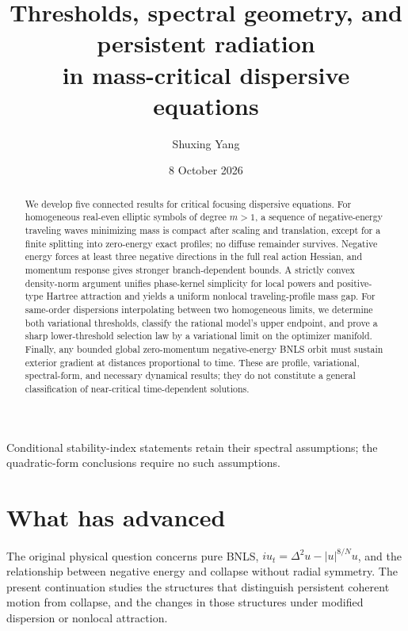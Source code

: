 \documentclass[11pt,a4paper]{article}
\title{Thresholds, spectral geometry, and persistent radiation\\in mass-critical dispersive equations}
\author{Shuxing Yang}
\date{8 October 2026}
\theoremstyle{remark}\newtheorem{remark}[theorem]{Remark}
\begin{document}
\maketitle
\begin{abstract}
We develop five connected results for critical focusing dispersive equations.
For homogeneous real-even elliptic symbols of degree $m>1$, a sequence of
negative-energy traveling waves minimizing mass is compact after scaling
and translation, except for a finite splitting into zero-energy exact
profiles; no diffuse remainder survives. Negative energy forces at least
three negative directions in the full real action Hessian, and momentum
response gives stronger branch-dependent bounds. A strictly convex
density-norm argument unifies phase-kernel simplicity for local powers
and positive-type Hartree attraction and yields a uniform nonlocal
traveling-profile mass gap. For same-order dispersions interpolating
between two homogeneous limits, we determine both variational thresholds,
classify the rational model's upper endpoint, and prove a sharp
lower-threshold selection law by a variational limit on the optimizer
manifold. Finally, any bounded global zero-momentum negative-energy BNLS
orbit must sustain exterior gradient at distances proportional to time.
These are profile, variational, spectral-form, and necessary dynamical
results; they do not constitute a general classification of near-critical
time-dependent solutions.
\end{abstract}
Conditional stability-index statements retain their spectral assumptions; the quadratic-form conclusions require no such assumptions.

\section*{What has advanced}
The original physical question concerns pure BNLS,
$iu_t=\Delta^2u-|u|^{8/N}u$, and the relationship between negative
energy and collapse without radial symmetry. The present continuation
studies the structures that distinguish persistent coherent motion from
collapse, and the changes in those structures under modified dispersion
or nonlocal attraction.
\end{document}
